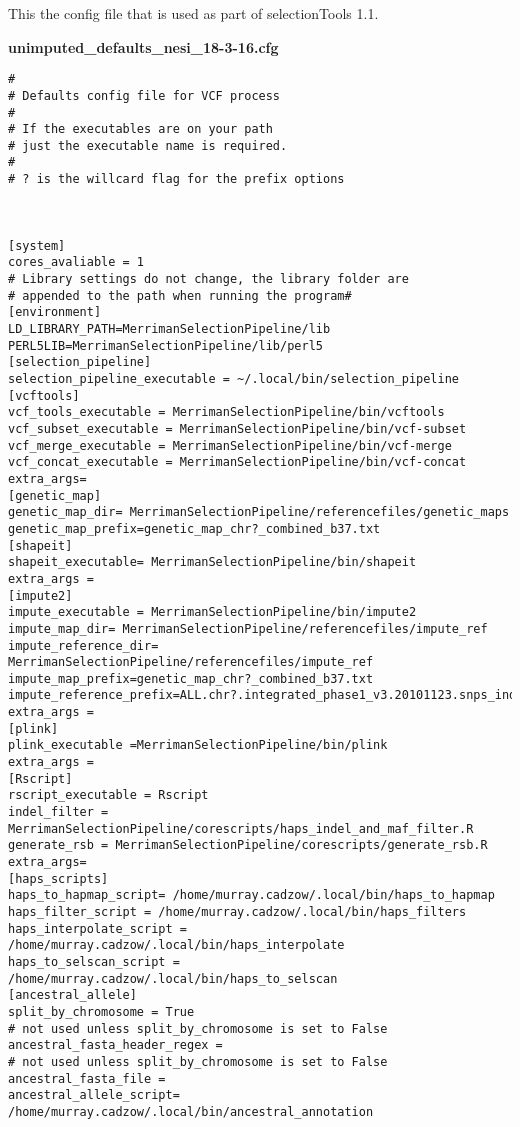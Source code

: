 \documentclass[twoside,openright]{report}
\begin{document}
\begin{appendices}
This the config file that is used as part of selectionTools 1.1.

\textbf{unimputed\_defaults\_nesi\_18-3-16.cfg}

\begin{verbatim}
#
# Defaults config file for VCF process
#
# If the executables are on your path 
# just the executable name is required.
#
# ? is the willcard flag for the prefix options



[system]
cores_avaliable = 1
# Library settings do not change, the library folder are 
# appended to the path when running the program#
[environment]
LD_LIBRARY_PATH=MerrimanSelectionPipeline/lib
PERL5LIB=MerrimanSelectionPipeline/lib/perl5
[selection_pipeline]
selection_pipeline_executable = ~/.local/bin/selection_pipeline
[vcftools]
vcf_tools_executable = MerrimanSelectionPipeline/bin/vcftools
vcf_subset_executable = MerrimanSelectionPipeline/bin/vcf-subset
vcf_merge_executable = MerrimanSelectionPipeline/bin/vcf-merge
vcf_concat_executable = MerrimanSelectionPipeline/bin/vcf-concat
extra_args= 
[genetic_map]
genetic_map_dir= MerrimanSelectionPipeline/referencefiles/genetic_maps
genetic_map_prefix=genetic_map_chr?_combined_b37.txt
[shapeit]
shapeit_executable= MerrimanSelectionPipeline/bin/shapeit
extra_args =
[impute2]
impute_executable = MerrimanSelectionPipeline/bin/impute2
impute_map_dir= MerrimanSelectionPipeline/referencefiles/impute_ref
impute_reference_dir= MerrimanSelectionPipeline/referencefiles/impute_ref
impute_map_prefix=genetic_map_chr?_combined_b37.txt
impute_reference_prefix=ALL.chr?.integrated_phase1_v3.20101123.snps_indels_svs.genotypes.nomono
extra_args = 
[plink]
plink_executable =MerrimanSelectionPipeline/bin/plink
extra_args = 
[Rscript]
rscript_executable = Rscript
indel_filter = MerrimanSelectionPipeline/corescripts/haps_indel_and_maf_filter.R
generate_rsb = MerrimanSelectionPipeline/corescripts/generate_rsb.R
extra_args=
[haps_scripts]
haps_to_hapmap_script= /home/murray.cadzow/.local/bin/haps_to_hapmap
haps_filter_script = /home/murray.cadzow/.local/bin/haps_filters
haps_interpolate_script = /home/murray.cadzow/.local/bin/haps_interpolate
haps_to_selscan_script = /home/murray.cadzow/.local/bin/haps_to_selscan
[ancestral_allele]
split_by_chromosome = True
# not used unless split_by_chromosome is set to False
ancestral_fasta_header_regex = 
# not used unless split_by_chromosome is set to False
ancestral_fasta_file =
ancestral_allele_script= /home/murray.cadzow/.local/bin/ancestral_annotation


\end{verbatim}
\end{appendices}
\end{document}
